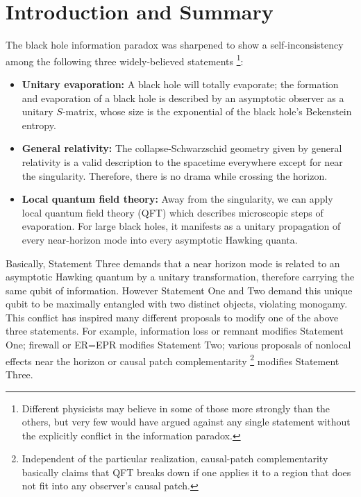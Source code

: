 \documentclass[aps,showpacs,twocolumn,floats,prd,superscriptaddress,nofootinbib]{revtex4-1}
\begin{document}
\maketitle


\onecolumngrid

\section{Introduction and Summary}

The black hole information paradox \cite{Haw76a} was sharpened to show a self-inconsistency among the following three widely-believed statements \cite{AMPS}
\footnote{Different physicists may believe in some of those more strongly than the others, but very few would have argued against any single statement without the explicitly conflict in the information paradox.}:
\begin{itemize}
\item {\bf Unitary evaporation:} A black hole will totally evaporate; the formation and evaporation of a black hole is described by an asymptotic observer as a unitary $S$-matrix, whose size is the exponential of the black hole's Bekenstein entropy.
\item {\bf General relativity:} The collapse-Schwarzschid geometry given by general relativity is a valid description to the spacetime everywhere except for near the singularity.
Therefore, there is no drama while crossing the horizon.
\item {\bf Local quantum field theory:} Away from the singularity, we can apply local quantum field theory (QFT) which describes microscopic steps of evaporation. 
For large black holes, it manifests as a unitary propagation of every near-horizon mode into every asymptotic Hawking quanta.
\end{itemize}
Basically, Statement Three demands that a near horizon mode is related to an asymptotic Hawking quantum by a unitary transformation, therefore carrying the same qubit of information. 
However Statement One and Two demand this unique qubit to be maximally entangled with two distinct objects, violating monogamy. 
This conflict has inspired many different proposals to modify one of the above three statements. 
For example, information loss or remnant \cite{Bek94} modifies Statement One; 
firewall \cite{BraPir09,AMPS} or ER=EPR \cite{MalSus13} modifies Statement Two;
various proposals of nonlocal effects near the horizon \cite{Gid12,DodSil15,OsuPag16} or causal patch complementarity \cite{HuiYan13,IlgYan13,LowTho14}
\footnote{Independent of the particular realization, causal-patch complementarity basically claims that QFT breaks down if one applies it to a region that does not fit into any observer's causal patch.} 
modifies Statement Three.
\end{document}
